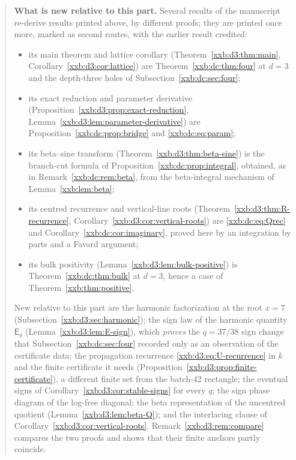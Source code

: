 \documentclass[11pt,a4paper]{article}
\numberwithin{equation}{section}
\theoremstyle{definition}
\theoremstyle{remark}
\theoremstyle{plain}
\begin{document}
\begin{quote}
\smallskip
\textbf{What is new relative to this part.}  Several results of the manuscript
re-derive results printed above, by different proofs; they are printed once
more, marked as second routes, with the earlier result credited:
\begin{itemize}[leftmargin=1.4em,itemsep=1pt]
\item its main theorem and lattice corollary
 (Theorem~\ref{xxb:d3:thm:main}, Corollary~\ref{xxb:d3:cor:lattice}) are
 Theorem~\ref{xxb:dc:thm:four} at $d=3$ and the depth-three holes of
 Subsection~\ref{xxb:dc:sec:four};
\item its exact reduction and parameter derivative
 (Proposition~\ref{xxb:d3:prop:exact-reduction},
 Lemma~\ref{xxb:d3:lem:parameter-derivative}) are
 Proposition~\ref{xxb:dc:prop:bridge} and \eqref{xxb:dc:eq:param};
\item its beta--sine transform (Theorem~\ref{xxb:d3:thm:beta-sine}) is the
 branch-cut formula of Proposition~\ref{xxb:dc:prop:integral}, obtained, as in
 Remark~\ref{xxb:dc:rem:beta}, from the beta-integral mechanism of
 Lemma~\ref{xxb:lem:beta};
\item its centred recurrence and vertical-line roots
 (Theorem~\ref{xxb:d3:thm:R-recurrence},
 Corollary~\ref{xxb:d3:cor:vertical-roots}) are \eqref{xxb:dc:eq:Qrec} and
 Corollary~\ref{xxb:dc:cor:imaginary}, proved here by an integration by parts
 and a Favard argument;
\item its bulk positivity (Lemma~\ref{xxb:d3:lem:bulk-positive}) is
 Theorem~\ref{xxb:dc:thm:bulk} at $d=3$, hence a case of
 Theorem~\ref{xxb:thm:positive}.
\end{itemize}
New relative to this part are the harmonic factorization at the root $x=7$
(Subsection~\ref{xxb:d3:sec:harmonic}); the sign law of the harmonic quantity
$\mathsf E_q$ (Lemma~\ref{xxb:d3:lem:E-sign}), which \emph{proves} the
$q=37/38$ sign change that Subsection~\ref{xxb:dc:sec:four} recorded only as
an observation of the certificate data; the propagation recurrence
\eqref{xxb:d3:eq:U-recurrence} in $k$ and the finite certificate it needs
(Proposition~\ref{xxb:d3:prop:finite-certificate}), a different finite set
from the batch-42 rectangle; the eventual signs of
Corollary~\ref{xxb:d3:cor:stable-signs} for every $q$; the sign phase diagram
of the log-free diagonal; the beta representation of the uncentred quotient
(Lemma~\ref{xxb:d3:lem:beta-Q}); and the interlacing clause of
Corollary~\ref{xxb:d3:cor:vertical-roots}.  Remark~\ref{xxb:d3:rem:compare}
compares the two proofs and shows that their finite anchors partly coincide.


\end{quote}
\end{document}
